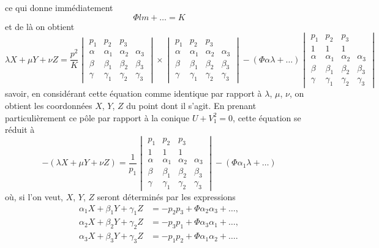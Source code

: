 \documentclass[12pt,a4paper]{article}
\theoremstyle{definition}
\begin{document}
ce qui donne imm\'{e}diatement
\[
\Phi lm + \ldots = K
\]
et de l\`{a} on obtient
\[
\lambda X + \mu Y + \nu Z = \frac{p^2}{K}
\begin{vmatrix}
p_1 & p_2 & p_3 \\
\alpha & \alpha_1 & \alpha_2 & \alpha_3 \\
\beta & \beta_1 & \beta_2 & \beta_3 \\
\gamma & \gamma_1 & \gamma_2 & \gamma_3
\end{vmatrix}
\times
\begin{vmatrix}
p_1 & p_2 & p_3 \\
\alpha & \alpha_1 & \alpha_2 & \alpha_3 \\
\beta & \beta_1 & \beta_2 & \beta_3 \\
\gamma & \gamma_1 & \gamma_2 & \gamma_3
\end{vmatrix}
- (\Phi \alpha \lambda + \ldots)
\begin{vmatrix}
p_1 & p_2 & p_3 \\
1 & 1 & 1 \\
\alpha & \alpha_1 & \alpha_2 & \alpha_3 \\
\beta & \beta_1 & \beta_2 & \beta_3 \\
\gamma & \gamma_1 & \gamma_2 & \gamma_3
\end{vmatrix}
\]
savoir, en consid\'{e}rant cette \'{e}quation comme identique par rapport \`{a} $\lambda$, $\mu$, $\nu$, on obtient les coordonn\'{e}es $X$, $Y$, $Z$ du point dont il s'agit. En prenant particuli\`{e}rement ce p\^{o}le par rapport \`{a} la conique $U + V_1^2 = 0$, cette \'{e}quation se r\'{e}duit \`{a}
\[
-(\lambda X + \mu Y + \nu Z) = \frac{1}{p_1}
\begin{vmatrix}
p_1 & p_2 & p_3 \\
1 & 1 & 1 \\
\alpha & \alpha_1 & \alpha_2 & \alpha_3 \\
\beta & \beta_1 & \beta_2 & \beta_3 \\
\gamma & \gamma_1 & \gamma_2 & \gamma_3
\end{vmatrix}
-(\Phi \alpha_1 \lambda + \ldots)
\]
o\`{u}, si l'on veut, $X$, $Y$, $Z$ seront d\'{e}termin\'{e}s par les expressions
\begin{align}
\tag{8} \alpha_1 X + \beta_1 Y + \gamma_1 Z &= -p_2 p_3 + \Phi \alpha_2 \alpha_3 + \ldots, \\
\tag{9} \alpha_2 X + \beta_2 Y + \gamma_2 Z &= -p_3 p_1 + \Phi \alpha_3 \alpha_1 + \ldots, \\
\alpha_3 X + \beta_3 Y + \gamma_3 Z &= -p_1 p_2 + \Phi \alpha_1 \alpha_2 + \ldots.
\end{align}
\end{document}
